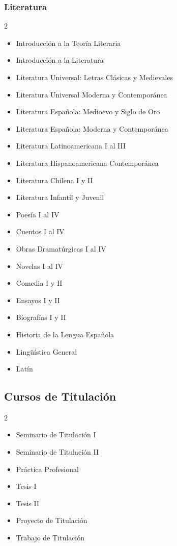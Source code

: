 \documentclass[12pt,a4paper]{article}
\begin{document}
	\subsubsection{Literatura}
	\begin{multicols}{2}
		\begin{itemize}
			\item Introducción a la Teoría Literaria
			\item Introducción a la Literatura
			\item Literatura Universal: Letras Clásicas y Medievales
			\item Literatura Universal Moderna y Contemporánea
			\item Literatura Española: Medioevo y Siglo de Oro
			\item Literatura Española: Moderna y Contemporánea
			\item Literatura Latinoamericana I al III
			\item Literatura Hispanoamericana Contemporánea
			\item Literatura Chilena I y II
			\item Literatura Infantil y Juvenil
			\item Poesía I al IV
			\item Cuentos I al IV
			\item Obras Dramatúrgicas I al IV
			\item Novelas I al IV
			\item Comedia I y II
			\item Ensayos I y II
			\item Biografías I y II
		\item Historia de la Lengua Española
		\item Lingüística General
		\item Latín
	\end{itemize}
\end{multicols}

\subsection{Cursos de Titulación}

\begin{multicols}{2}
	\begin{itemize}
		\item Seminario de Titulación I
		\item Seminario de Titulación II
		\item Práctica Profesional
		\item Tesis I
		\item Tesis II
		\item Proyecto de Titulación
		\item Trabajo de Titulación
	\end{itemize}
\end{multicols}
\end{document}
